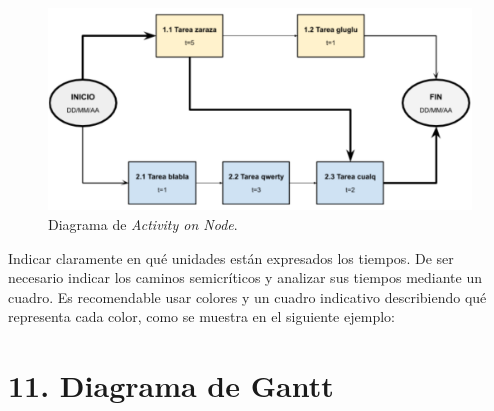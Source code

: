\documentclass[
11pt, %
codirector, %
]{charter}
\begin{document}
\begin{figure}[htpb]
\centering 
\includegraphics[width=.8\textwidth]{./Figuras/AoN.png}
\caption{Diagrama de \textit{Activity on Node}.}
\label{fig:AoN}
\end{figure}

Indicar claramente en qué unidades están expresados los tiempos.
De ser necesario indicar los caminos semicríticos y analizar sus tiempos mediante un cuadro.
Es recomendable usar colores y un cuadro indicativo describiendo qué representa cada color, como se muestra en el siguiente ejemplo:



\section{11. Diagrama de Gantt}
\label{sec:gantt}
\end{document}

